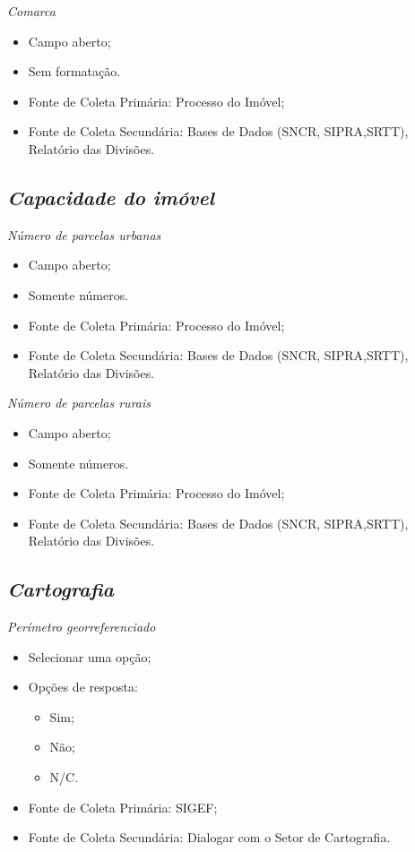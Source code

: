 \documentclass[
  letterpaper,
]{report}
\providecommand{\tightlist}{%
  \setlength{\itemsep}{0pt}\setlength{\parskip}{0pt}}\usepackage{longtable,booktabs,array}
\begin{document}
\emph{Comarca}

\begin{itemize}
\tightlist
\item
  Campo aberto;
\item
  Sem formatação.
\item
  Fonte de Coleta Primária: Processo do Imóvel;
\item
  Fonte de Coleta Secundária: Bases de Dados (SNCR, SIPRA,SRTT),
  Relatório das Divisões.
\end{itemize}

\hypertarget{capacidade-do-imuxf3vel}{%
\subsection{\texorpdfstring{\emph{Capacidade do
imóvel}}{Capacidade do imóvel}}\label{capacidade-do-imuxf3vel}}

\emph{Número de parcelas urbanas}

\begin{itemize}
\tightlist
\item
  Campo aberto;
\item
  Somente números.
\item
  Fonte de Coleta Primária: Processo do Imóvel;
\item
  Fonte de Coleta Secundária: Bases de Dados (SNCR, SIPRA,SRTT),
  Relatório das Divisões.
\end{itemize}

\emph{Número de parcelas rurais}

\begin{itemize}
\tightlist
\item
  Campo aberto;
\item
  Somente números.
\item
  Fonte de Coleta Primária: Processo do Imóvel;
\item
  Fonte de Coleta Secundária: Bases de Dados (SNCR, SIPRA,SRTT),
  Relatório das Divisões.
\end{itemize}

\hypertarget{cartografia}{%
\subsection{\texorpdfstring{\emph{Cartografia}}{Cartografia}}\label{cartografia}}

\emph{Perímetro georreferenciado}

\begin{itemize}
\tightlist
\item
  Selecionar uma opção;
\item
  Opções de resposta:

  \begin{itemize}
  \tightlist
  \item
    Sim;
  \item
    Não;
  \item
    N/C.
  \end{itemize}
\item
  Fonte de Coleta Primária: SIGEF;
\item
  Fonte de Coleta Secundária: Dialogar com o Setor de Cartografia.
\end{itemize}
\end{document}
